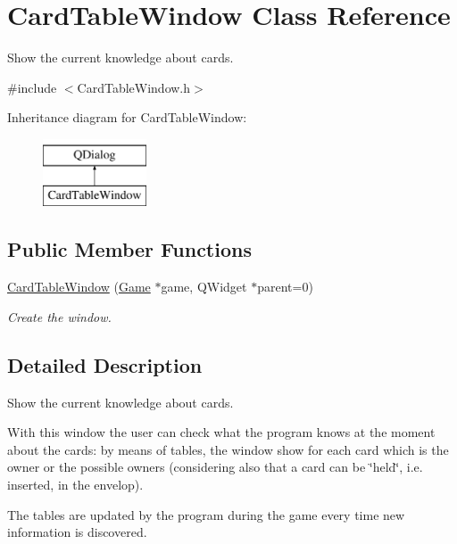 \hypertarget{classCardTableWindow}{}\section{Card\+Table\+Window Class Reference}
\label{classCardTableWindow}


Show the current knowledge about cards.  




{\ttfamily \#include $<$Card\+Table\+Window.\+h$>$}

Inheritance diagram for Card\+Table\+Window\+:\begin{figure}[H]
\begin{center}
\leavevmode
\includegraphics[height=2.000000cm]{classCardTableWindow}
\end{center}
\end{figure}
\subsection*{Public Member Functions}
\begin{DoxyCompactItemize}
\item 
\hyperlink{classCardTableWindow_a33e045d1c86fdf5ab05e3da2c5a575e1}{Card\+Table\+Window} (\hyperlink{classGame}{Game} $\ast$game, Q\+Widget $\ast$parent=0)
\begin{DoxyCompactList}\small\item\em Create the window. \end{DoxyCompactList}\end{DoxyCompactItemize}


\subsection{Detailed Description}
Show the current knowledge about cards. 

With this window the user can check what the program knows at the moment about the cards\+: by means of tables, the window show for each card which is the owner or the possible owners (considering also that a card can be \char`\"{}held\char`\"{}, i.\+e. inserted, in the envelop).

The tables are updated by the program during the game every time new information is discovered. 

